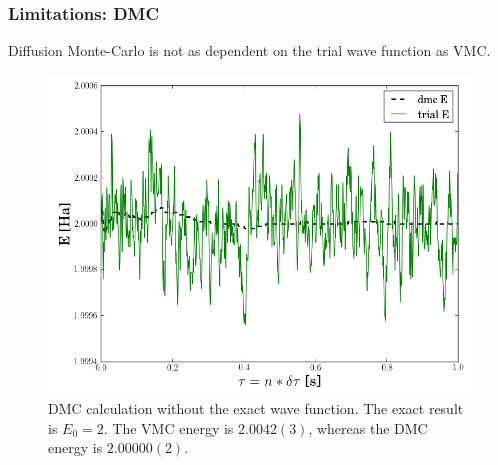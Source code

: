 \begin{frame}
   \frametitle{Limitations: DMC}
   
   Diffusion Monte-Carlo is not as dependent on the trial wave function as VMC.
   
\end{frame}

\begin{frame}
 \begin{figure}
  \begin{center}
   \includegraphics[scale=0.35]{../graphics/DMC_notExactWF.png}
  \end{center}
  \caption{DMC calculation without the exact wave function. The exact result is $E_0=2$. The VMC energy is $2.0042(3)$, whereas the DMC energy is $2.00000(2)$.}
 \end{figure}
\end{frame}


